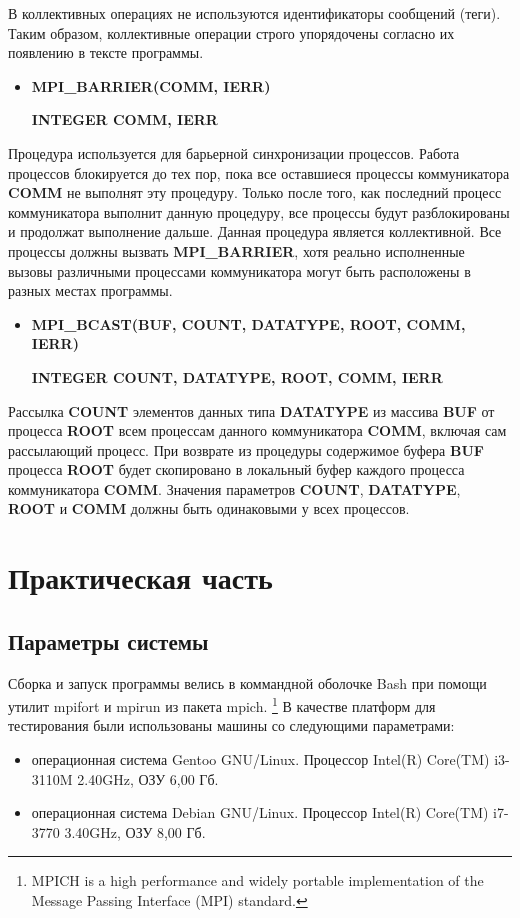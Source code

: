 \documentclass[14pt,a4paper,report]{ncc}
\begin{document}
В коллективных операциях не используются идентификаторы сообщений (теги). Таким образом, коллективные операции строго упорядочены согласно их появлению в тексте программы.
\begin{itemize}


\item\textbf{MPI\_BARRIER(COMM, IERR)}
\

\textbf{INTEGER COMM, IERR}
\
\end{itemize}
Процедура используется для барьерной синхронизации процессов. Работа процессов блокируется до тех пор, пока все оставшиеся процессы коммуникатора \textbf{COMM} не выполнят эту процедуру. Только после того, как последний процесс коммуникатора выполнит данную процедуру, все процессы будут разблокированы и продолжат выполнение дальше. Данная процедура является коллективной. Все процессы должны вызвать \textbf{MPI\_BARRIER}, хотя реально исполненные вызовы различными процессами коммуникатора могут быть расположены в разных местах программы.
\begin{itemize}
\item\textbf{MPI\_BCAST(BUF, COUNT, DATATYPE, ROOT, COMM, IERR)}

\textbf{INTEGER COUNT, DATATYPE, ROOT, COMM, IERR}
\end{itemize}
Рассылка \textbf{COUNT} элементов данных типа \textbf{DATATYPE} из массива \textbf{BUF} от процесса \textbf{ROOT} всем процессам данного коммуникатора \textbf{COMM}, включая сам рассылающий процесс. При возврате из процедуры содержимое буфера \textbf{BUF} процесса \textbf{ROOT} будет скопировано в локальный буфер каждого процесса коммуникатора \textbf{COMM}. Значения параметров \textbf{COUNT}, \textbf{DATATYPE},  \textbf{ROOT} и \textbf{COMM} должны быть одинаковыми у всех процессов.
\


\chapter*{Практическая часть}
\section{Параметры системы}
Сборка и запуск программы велись в коммандной оболочке Bash при помощи утилит mpifort и mpirun из пакета mpich.
\footnote{MPICH is a high performance and widely portable implementation of the Message Passing Interface (MPI) standard.}
В качестве платформ для тестирования были использованы машины со следующими параметрами: 
\begin{itemize}


\item операционная система Gentoo GNU/Linux. Процессор Intel(R) Core(TM) i3-3110M 2.40GHz, ОЗУ 6,00 Гб.
\item операционная система Debian GNU/Linux. Процессор Intel(R) Core(TM) i7-3770 3.40GHz, ОЗУ 8,00 Гб.
\end{itemize}
\end{document}
